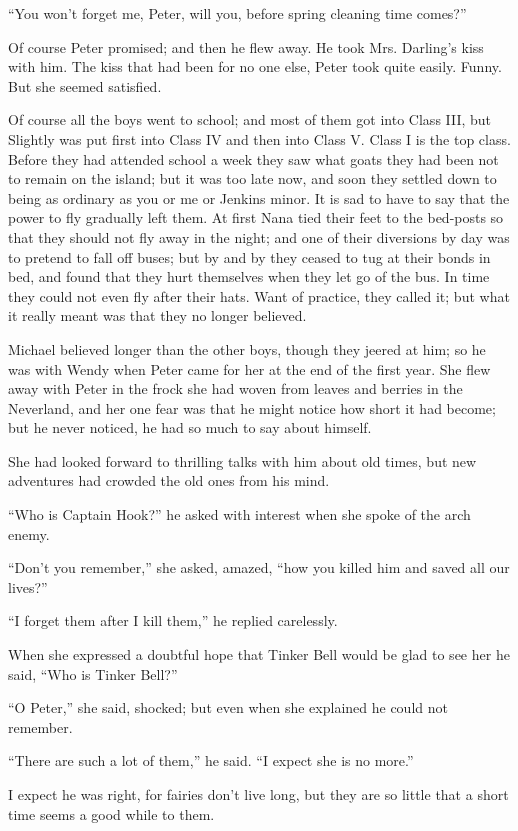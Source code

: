 ``You won't forget me, Peter, will you, before spring cleaning time
comes?''

Of course Peter promised; and then he flew away. He took Mrs. Darling's
kiss with him. The kiss that had been for no one else, Peter took quite
easily. Funny. But she seemed satisfied.

Of course all the boys went to school; and most of them got into Class
III, but Slightly was put first into Class IV and then into Class V.
Class I is the top class. Before they had attended school a week they
saw what goats they had been not to remain on the island; but it was
too late now, and soon they settled down to being as ordinary as you or
me or Jenkins minor. It is sad to have to say that the power to fly
gradually left them. At first Nana tied their feet to the bed-posts so
that they should not fly away in the night; and one of their diversions
by day was to pretend to fall off buses; but by and by they ceased to
tug at their bonds in bed, and found that they hurt themselves when
they let go of the bus. In time they could not even fly after their
hats. Want of practice, they called it; but what it really meant was
that they no longer believed.

Michael believed longer than the other boys, though they jeered at him;
so he was with Wendy when Peter came for her at the end of the first
year. She flew away with Peter in the frock she had woven from leaves
and berries in the Neverland, and her one fear was that he might notice
how short it had become; but he never noticed, he had so much to say
about himself.

She had looked forward to thrilling talks with him about old times, but
new adventures had crowded the old ones from his mind.

``Who is Captain Hook?'' he asked with interest when she spoke of the
arch enemy.

``Don't you remember,'' she asked, amazed, ``how you killed him and saved
all our lives?''

``I forget them after I kill them,'' he replied carelessly.

When she expressed a doubtful hope that Tinker Bell would be glad to
see her he said, ``Who is Tinker Bell?''

``O Peter,'' she said, shocked; but even when she explained he could not
remember.

``There are such a lot of them,'' he said. ``I expect she is no more.''

I expect he was right, for fairies don't live long, but they are so
little that a short time seems a good while to them.

